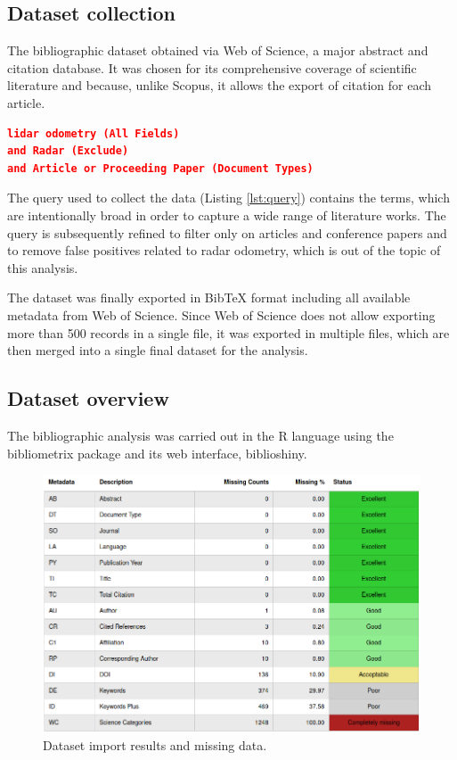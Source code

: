 \documentclass{article}
\begin{document}
\subsection{Dataset collection}
The bibliographic dataset obtained via Web of Science, a major abstract and citation database. It was chosen for its comprehensive coverage of scientific literature and because, unlike Scopus, it allows the export of citation for each article.

\vspace{1em}
\begin{lstlisting}[language=json,label={lst:query},caption={Web of Science query used to collect the dataset},captionpos=b,firstnumber=1,frame=single]
lidar odometry (All Fields)
and Radar (Exclude)
and Article or Proceeding Paper (Document Types)
\end{lstlisting}

The query used to collect the data (Listing \ref{lst:query}) contains the  terms, which are intentionally broad in order to capture a wide range of literature works. The query is subsequently refined to filter only on articles and conference papers and to remove false positives related to radar odometry, which is out of the topic of this analysis.

The dataset was finally exported in BibTeX format including all available metadata from Web of Science. Since Web of Science does not allow exporting more than 500 records in a single file, it was exported in multiple files, which are then merged into a single final dataset for the analysis.

\subsection{Dataset overview}
The bibliographic analysis was carried out in the R language using the bibliometrix\cite{bibliometrix} package and its web interface, biblioshiny\cite{biblioshiny}.

\begin{figure}[!htbp]
    \centering
    \includegraphics[width=1.0\textwidth]{img/import.png}
    \caption{Dataset import results and missing data.}
    \label{fig:import}
\end{figure}
\end{document}

